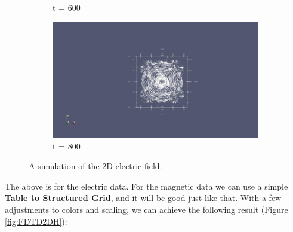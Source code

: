 \begin{figure}[h!]
\begin{subfigure}{.49\textwidth}
    	\caption{t = 600}
    \end{subfigure}
    \begin{subfigure}{.49\textwidth}
    	\centering
    	\includegraphics[width=.95\linewidth]{Figures/FDTD2DE4}
    	\caption{t = 800}
    \end{subfigure}
	\decoRule
	\caption[2D Electric Field Simulation]{A simulation of the 2D electric field.}
	\label{fig:FDTD2DE}
\end{figure}

The above is for the electric data. For the magnetic data we can use a simple \textbf{Table to Structured Grid}, and it will be good just like that. With a few adjustments to colors and scaling, we can achieve the following result (Figure \ref{fig:FDTD2DH}):

